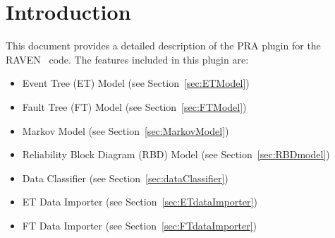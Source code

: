 \section{Introduction}
\label{sec:Introduction}

This document provides a detailed description of the PRA plugin for the RAVEN~\cite{RAVEN,RAVENtheoryMan} code.
The features included in this plugin are:
\begin{itemize}
	\item Event Tree (ET) Model (see Section~\ref{sec:ETModel}) 
	\item Fault Tree (FT) Model (see Section~\ref{sec:FTModel})
	\item Markov Model (see Section~\ref{sec:MarkovModel})
	\item Reliability Block Diagram (RBD) Model (see Section~\ref{sec:RBDmodel})
	\item Data Classifier (see Section~\ref{sec:dataClassifier})
	\item ET Data Importer (see Section~\ref{sec:ETdataImporter}) 
	\item FT Data Importer (see Section~\ref{sec:FTdataImporter})
\end{itemize}
